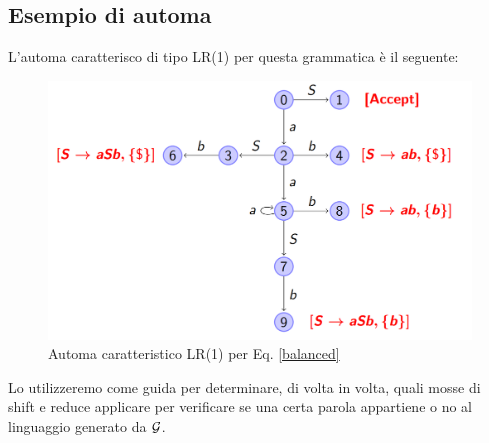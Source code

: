 \documentclass[class=book, crop=false, oneside, 12pt]{standalone}
\begin{document}
\subsection{Esempio di automa}
L'automa caratterisco di tipo LR(1) per questa grammatica è il seguente:
\begin{figure}[H]
    \centering
    \includegraphics[width=\textwidth,keepaspectratio]{balanced-char_aut-lr1.png}
    \caption{Automa caratteristico LR(1) per Eq. \ref{balanced}}
    \label{balanced-char_aut-lr1}
\end{figure}
Lo utilizzeremo come guida per determinare, di volta in volta, quali mosse di shift e reduce applicare per verificare se una certa parola appartiene o no al linguaggio generato da \(\mathcal{G}\). 
\end{document}
